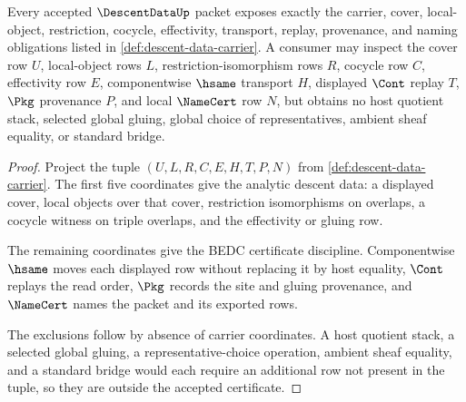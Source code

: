 \begin{theorem}\label{thm:descent-data-namecert-obligations}
Every accepted $\DescentDataUp$ packet exposes exactly the carrier, cover, local-object, restriction, cocycle, effectivity, transport, replay, provenance, and naming obligations listed in \autoref{def:descent-data-carrier}. A consumer may inspect the cover row $U$, local-object rows $L$, restriction-isomorphism rows $R$, cocycle row $C$, effectivity row $E$, componentwise $\hsame$ transport $H$, displayed $\Cont$ replay $T$, $\Pkg$ provenance $P$, and local $\NameCert$ row $N$, but obtains no host quotient stack, selected global gluing, global choice of representatives, ambient sheaf equality, or standard bridge.
\end{theorem}
\begin{proof}
Project the tuple $(U,L,R,C,E,H,T,P,N)$ from \autoref{def:descent-data-carrier}. The first five coordinates give the analytic descent data: a displayed cover, local objects over that cover, restriction isomorphisms on overlaps, a cocycle witness on triple overlaps, and the effectivity or gluing row.

The remaining coordinates give the BEDC certificate discipline. Componentwise $\hsame$ moves each displayed row without replacing it by host equality, $\Cont$ replays the read order, $\Pkg$ records the site and gluing provenance, and $\NameCert$ names the packet and its exported rows.

The exclusions follow by absence of carrier coordinates. A host quotient stack, a selected global gluing, a representative-choice operation, ambient sheaf equality, and a standard bridge would each require an additional row not present in the tuple, so they are outside the accepted certificate.
\end{proof}


